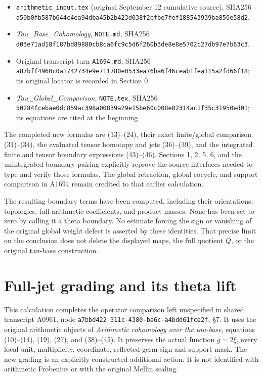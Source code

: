\documentclass[10pt,a4paper,oneside]{report}
\providecommand{\tightlist}{\setlength{\itemsep}{0pt}\setlength{\parskip}{0pt}}
\begin{document}
\begin{itemize}
\tightlist
\item
  \texttt{arithmetic\_\allowbreak{}input.tex} (original September 12 cumulative
  source), SHA256
  \nolinkurl{a50b0fb587b644c4ea94dba45b2b423d038f2bfbe7fef188543939ba850e58d2}.
\item
  \emph{Tau\_Base\_Cohomology}, \texttt{NOTE.md}, SHA256
  \nolinkurl{d03e71ad18f187bd89880cb8ca6fc9c5d6f260b3de8e8e5702c27db97e7b63c3}.
\item
  Original transcript turn \texttt{A1694.md}, SHA256
  \nolinkurl{a87bff4960c0a1742734e9e711780e0533ea76ba6f46ceab1fea115a2fd66f18};
  its original locator is recorded in Section 0.
\item
  \emph{Tau\_Global\_Comparison}, \texttt{NOTE.tex}, SHA256
  \nolinkurl{50284fcebae0dc859ac398a00839a29e15be60c008e02314ac1f35c31950ed01};
  its equations are cited at the beginning.
\end{itemize}

The completed new formulas are (13)--(24), their exact finite/global
comparison (31)--(34), the evaluated tensor homotopy and jets
(36)--(39), and the integrated finite and tensor boundary expressions
(43)--(46). Sections 1, 2, 5, 6, and the unintegrated boundary pairing
explicitly reprove the source interfaces needed to type and verify those
formulas. The global retraction, global cocycle, and support comparison
in A1694 remain credited to that earlier calculation.

The resulting boundary terms have been computed, including their
orientations, topologies, full arithmetic coefficients, and product
masses. None has been set to zero by calling it a theta boundary. No
estimate forcing the sign or vanishing of the original global weight
defect is asserted by these identities. That precise limit on the
conclusion does not delete the displayed maps, the full quotient \(Q\),
or the original tau-base construction.


\endgroup
\clearpage
\chapter{Full-jet grading and its theta lift}
\begingroup
This calculation completes the operator comparison left unspecified in
shared transcript A0961, node
\texttt{a7bbd422-\allowbreak{}311c-\allowbreak{}4380-\allowbreak{}ba6c-\allowbreak{}a4bdd61fce2f}, §7. It uses the original
arithmetic objects of \emph{Arithmetic cohomology over the tau-base},
equations (10)--(14), (19), (27), and (38)--(45). It preserves the
actual function \(g=2\xi\), every local unit, multiplicity, coordinate,
reflected-germ sign and support mask. The new grading is an explicitly
constructed additional action. It is not identified with arithmetic
Frobenius or with the original Mellin scaling.
\end{document}

